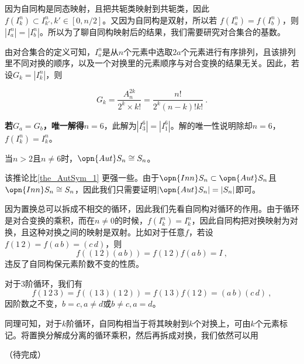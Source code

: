 因为自同构是同态映射，且把共轭类映射到共轭类，因此$f(I_k^n)\subset I_{k'}^n,k'\in [0,n/2]$。又因为自同构是双射，所以若 $f(I_a^n)=f(I_b^n)$，则$|I_a^n|=|I_b^n|$。所以为了聊自同构映射后的结果，我们需要研究对合集合的基数。

由对合集合的定义可知，$I_a^n$是从$n$个元素中选取$2a$个元素进行有序排列，且该排列里不同对换的顺序，以及一个对换里的元素顺序与对合变换的结果无关。因此，若设$G_k=|I_k^n|$，则

\begin{equation}
G_k=\frac{A_{n}^{2k}}{2^k\times k!}=\frac{n!}{2^k(n-k)!k!}~.
\end{equation}

\textbf{若$G_a=G_b$，唯一解得$n=6$}，此解为$|I^6_3|=|I^6_1|$。解的唯一性说明除却$n=6$，$f(I_k^n)=I_k^n$。

\begin{corollary}{}
当$n>2$且$n\neq 6$时，$\opn{Aut}S_n\cong S_n$。
\end{corollary}
该推论比\autoref{the_AutSym_1} 更强一些。由于$\opn{Inn}S_n\subset \opn{Aut} S_n$且$\opn{Inn}S_n\cong S_n$，因此我们只需要证明$|\opn{Aut}S_n|=|S_n|$即可。

因为置换总可以拆成不相交的循环，因此我们先看自同构对循环的作用。由于循环是对合变换的乘积，而在$n\neq 0$的时候，$f(I_k^n)=I_k^n$，因此自同构把对换映射为对换，且这种对换之间的映射是双射。比如对于任意$f$，若设$f(1\,2)=f(a\,b)=(c\,d)$，则
\begin{equation}
f((1\,2)(a\,b))=f(1\,2)f(a\,b)=I~,
\end{equation}
违反了自同构保元素阶数不变的性质。

对于3阶循环，我们有
\begin{equation}
f(1\,2\,3)=f((1\,3)(1\,2))=f(1\,3)f(1\,2)=(a\,b)(c\,d)~,
\end{equation}
因阶数之不变，$b=c,a\neq d$或$b\neq c,a=d$。

同理可知，对于$k$阶循环，自同构相当于将其映射到$k$个对换上，可由$k$个元素标记。将置换分解成分离的循环乘积，然后再拆成对换，我们依然可以用

（待完成）
